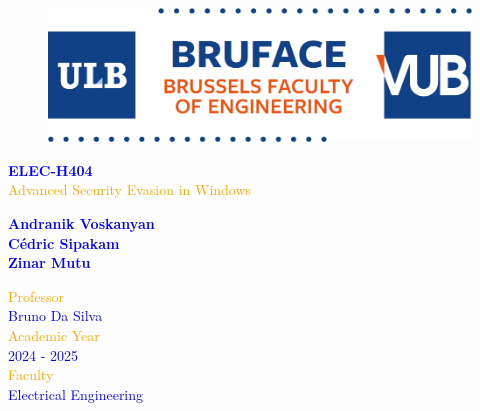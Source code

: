\begin{titlepage}
	\begin{center}
            \begin{figure}
                \centering
                \includegraphics[scale=0.3]{Images/logo.png}
            \end{figure}
		\vspace*{\fill}
            \normalsize
            {\selectfont
            \textcolor{blue}{\textbf{ELEC-H404}}}\\
            \vspace{0.2cm}
		\Huge
            {\selectfont
            \textcolor{orange}{Advanced Security Evasion in Windows}}\\
        \end{center}
	\begin{center}	
		\vspace{0.5cm}
            \Large
            {\selectfont
		\textcolor{blue}{\textbf{Andranik Voskanyan\\
								Cédric Sipakam\\
								Zinar Mutu}}}\\
	\end{center}
        \vspace*{\fill}
        \begin{FlushRight}
            {\selectfont
            \textcolor{orange}{Professor}}\\
            {\selectfont
            \textcolor{blue}{Bruno Da Silva}}\\
            \vspace{0.6cm}
            {\selectfont
            \textcolor{orange}{Academic Year}}\\
            {\selectfont
            \textcolor{blue}{2024 - 2025}}\\
            \vspace{0.6cm}
            {\selectfont
            \textcolor{orange}{Faculty}}\\
            {\selectfont
            \textcolor{blue}{Electrical Engineering}}
        \end{FlushRight}



\end{titlepage}